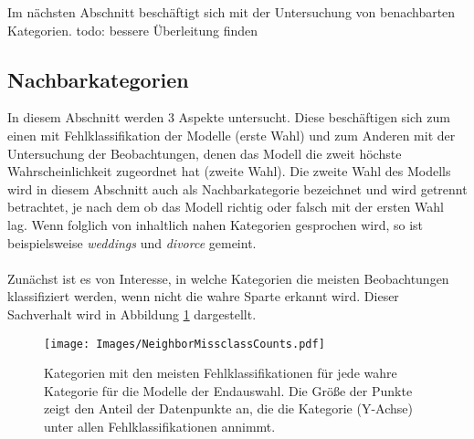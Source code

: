 \documentclass[a4paper,11pt]{article}
\begin{document}
Im nächsten Abschnitt beschäftigt sich mit der Untersuchung von benachbarten Kategorien. todo: bessere Überleitung finden

\subsection{Nachbarkategorien}

In diesem Abschnitt werden $3$ Aspekte untersucht. Diese beschäftigen sich zum einen mit Fehlklassifikation der Modelle (erste Wahl) und zum Anderen mit der Untersuchung der Beobachtungen, denen das Modell die zweit höchste Wahrscheinlichkeit zugeordnet hat (zweite Wahl). Die zweite Wahl des Modells wird in diesem Abschnitt auch als Nachbarkategorie bezeichnet und wird getrennt betrachtet, je nach dem ob das Modell richtig oder falsch mit der ersten Wahl lag. Wenn folglich von inhaltlich nahen Kategorien gesprochen wird, so ist beispielsweise \textit{weddings} und \textit{divorce} gemeint.\\
\\
Zunächst ist es von Interesse, in welche Kategorien die meisten Beobachtungen klassifiziert werden, wenn nicht die wahre Sparte erkannt wird. Dieser Sachverhalt wird in Abbildung \ref{abb:NeighborMissclassCounts} dargestellt.

\begin{figure}[ht]
    \centering
\texttt{[image: Images/NeighborMissclassCounts.pdf]} 
\caption{Kategorien mit den meisten Fehlklassifikationen für jede wahre Kategorie für die Modelle der Endauswahl. Die Größe der Punkte zeigt den Anteil der Datenpunkte an, die die Kategorie (Y-Achse) unter allen Fehlklassifikationen annimmt.}
\label{abb:NeighborMissclassCounts}
\end{figure}
\end{document}
